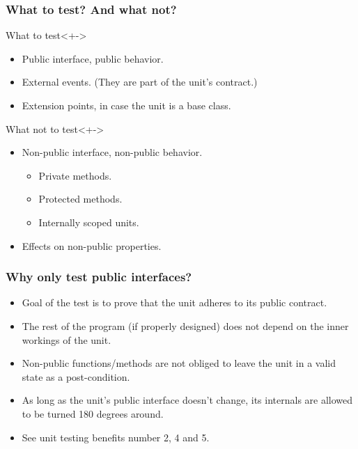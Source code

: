 \begin{frame}
	\frametitle{What to test? And what not?}

	\begin{block}{What to test}<+->
		\begin{itemize}[<+-| highlight@+>]
			\item Public interface, public behavior.
			\item External events. (They are part of the unit's contract.)
			\item Extension points, in case the unit is a base class.
		\end{itemize}
	\end{block}

	\begin{block}{What not to test}<+->
		\begin{itemize}[<+-| highlight@+>]
			\item Non-public interface, non-public behavior.
			\begin{itemize}[<+-| highlight@+>]
				\item Private methods.
				\item Protected methods.
				\item Internally scoped units.
			\end{itemize}
			\item Effects on non-public properties.
		\end{itemize}
	\end{block}
\end{frame}


\begin{frame}
	\frametitle{Why only test public interfaces?}

	\begin{itemize}[<+-| highlight@+>]
		\item Goal of the test is to prove that the unit adheres to its \alert{public} contract.
		\item The rest of the program (if properly designed) does not depend on the inner workings of the unit.
		\item Non-public functions/methods are not obliged to leave the unit in a valid state as a post-condition.
		\item As long as the unit's public interface doesn't change, its internals are allowed to be turned 180 degrees around.
		\item See unit testing benefits number 2, 4 and 5.
	\end{itemize}
\end{frame}


